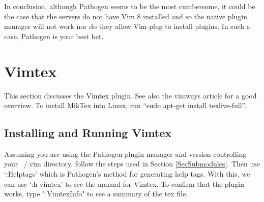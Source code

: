 In conclusion, although Pathogen seems to be the most cumbersome, it could be
the case that the servers do not have Vim 8 installed and so the native plugin
manager will not work nor do they allow Vim-plug to install plugins. In such a
case, Pathogen is your best bet.

\section{Vimtex}
This section discusses the Vimtex \cite{lervag2015vim} plugin. See also the
vimways article \cite{woodruff2019latex} for a good overview.  To install MikTex
into Linux, run ``sudo apt-get install texlive-full''.

\subsection{Installing and Running Vimtex}
Assuming you are using the Pathogen plugin manager and version controlling your
~/.vim directory, follow the steps used in Section \ref{SecSubmodules}. Then use
`:Helptags' which is Pathogen's method for generating help tags. With this, we
can use `:h vimtex' to see the manual for Vimtex. To confirm that the plugin
works, type ":VimtexInfo" to see a summary of the tex file.
